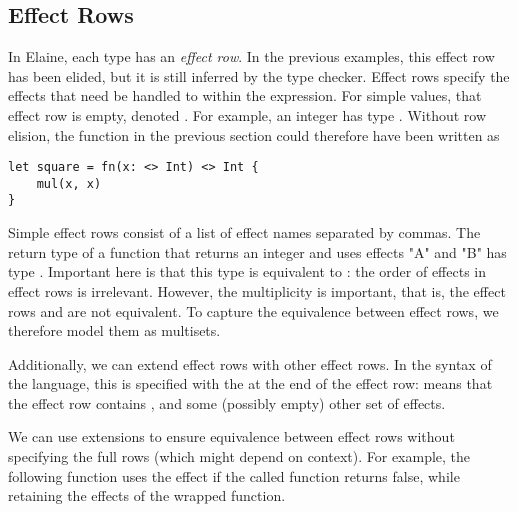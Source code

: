 \subsection{Effect Rows}


In Elaine, each type has an \emph{effect row}. In the previous examples, this effect row has been elided, but it is still inferred by the type checker. Effect rows specify the effects that need be handled to within the expression. For simple values, that effect row is empty, denoted \el{<>}. For example, an integer has type . Without row elision, the  function in the previous section could therefore have been written as

\begin{lstlisting}[language=elaine, style=fancy]
let square = fn(x: <> Int) <> Int {
    mul(x, x)
}
\end{lstlisting}

Simple effect rows consist of a list of effect names separated by commas. The return type of a function that returns an integer and uses effects "A" and "B" has type . Important here is that this type is equivalent to : the order of effects in effect rows is irrelevant. However, the multiplicity is important, that is,  the effect rows  and  are not equivalent. To capture the equivalence between effect rows, we therefore model them as multisets.

Additionally, we can extend effect rows with other effect rows. In the syntax of the language, this is specified with the \el{|} at the end of the effect row:  means that the effect row contains ,  and some (possibly empty) other set of effects.

We can use extensions to ensure equivalence between effect rows without specifying the full rows (which might depend on context). For example, the following function uses the  effect if the called function returns false, while retaining the effects of the wrapped function.

